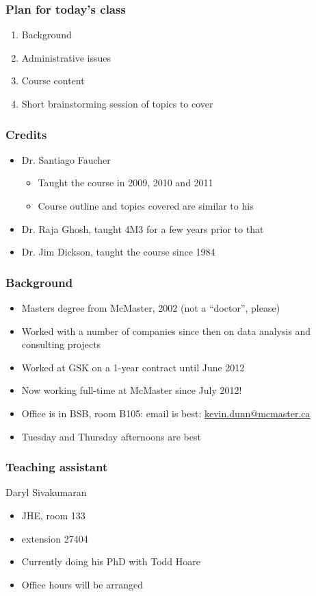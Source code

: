 
\begin{frame}\frametitle{Plan for today's class}
	\begin{enumerate}
		\item	Background
		\item	Administrative issues
		\item	Course content
		\item	Short brainstorming session of topics to cover
	\end{enumerate}
\end{frame}

\begin{frame}\frametitle{Credits}
	
	\begin{itemize}
		\item	Dr. Santiago Faucher
		\begin{itemize}
			\item	Taught the course in 2009, 2010 and 2011
			\item	Course outline and topics covered are similar to his
		\end{itemize}
		\item	Dr. Raja Ghosh, taught 4M3 for a few years prior to that
		\item	Dr. Jim Dickson, taught the course since 1984
	\end{itemize}	
\end{frame}

\begin{frame}\frametitle{Background}
	\begin{itemize}
		\item	Masters degree from McMaster, 2002 (not a ``doctor'', please)
		\item	Worked with a number of companies since then on data analysis and consulting projects
		\item	Worked at GSK on a 1-year contract until June 2012		
		\item	Now working full-time at McMaster since July 2012!
		\item	Office is in BSB, room B105: email is best: \url{kevin.dunn@mcmaster.ca}
		\item	Tuesday and Thursday afternoons are best
	\end{itemize}	
\end{frame}

\begin{frame}\frametitle{Teaching assistant}
	Daryl Sivakumaran
	\begin{itemize}
		\item	JHE, room 133
		\item	extension 27404
		\item	Currently doing his PhD with Todd Hoare
		\item	Office hours will be arranged
	\end{itemize}
\end{frame}

